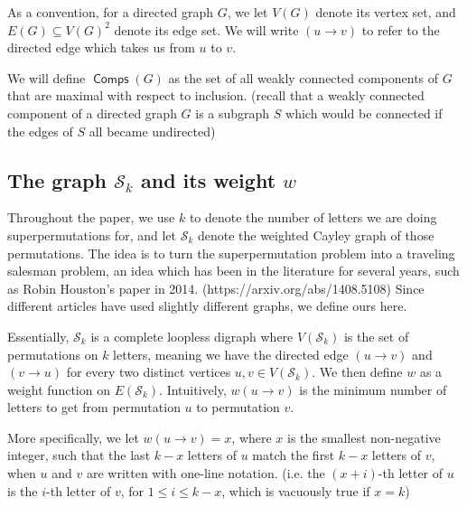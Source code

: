 \documentclass{article}
\theoremstyle{definition}
\DeclareMathOperator{\Comp}{\bm{\mathsf{Comps}}}
\newcommand{\hide}[1]{}
\begin{document}
As a convention, for a directed graph $G$, we let $V(G)$ denote its vertex set, and $E(G) \subseteq V(G)^2$ denote its edge set. We will write $(u\to v)$ to refer to the directed edge which takes us from $u$ to $v$.

We will define $\Comp(G)$ as the set of all weakly connected components of $G$ that are maximal with respect to inclusion. (recall that a weakly connected component of a directed graph $G$ is a subgraph $S$ which would be connected if the edges of $S$ all became undirected)

\subsection{The graph $\mathcal{S}_k$ and its weight $w$} 

Throughout the paper, we use $k$ to denote the number of letters we are doing superpermutations for, and let $\mathcal{S}_k$ denote the weighted Cayley graph of those permutations. The idea is to turn the superpermutation problem into a traveling salesman problem, an idea which has been in the literature for several years, such as Robin Houston's paper in 2014. (https://arxiv.org/abs/1408.5108)\hide{@misc{houston2014tackling,
    title={Tackling the Minimal Superpermutation Problem},
    author={Robin Houston},
    year={2014},
    eprint={1408.5108},
    archivePrefix={arXiv},
    primaryClass={math.CO}
}} Since different articles have used slightly different graphs, we define ours here.

Essentially, $\mathcal{S}_k$ is a complete loopless digraph where $V(\mathcal{S}_k)$ is the set of permutations on $k$ letters, meaning we have the directed edge $(u \to v)$ and $(v \to u)$ for every two distinct vertices $u,v \in V(\mathcal{S}_k)$. We then define $w$ as a weight function on $E(\mathcal{S}_k)$. Intuitively, $w(u\to v)$ is the minimum number of letters to get from permutation $u$ to permutation $v$. 
 
 More specifically, we let $w(u\to v) = x$, where $x$ is the smallest non-negative integer, such that the last $k-x$ letters of $u$ match the first $k-x$ letters of $v$, when $u$ and $v$ are written with one-line notation. (i.e. the $(x+i)$-th letter of $u$ is the $i$-th letter of $v$, for $1\le i \le k-x $, which is vacuously true if $x = k$)
 
 \hide{Specifically, we will define $\mathcal{S}_k$ through the $k$-dimensional De Bruijn graph on $k$ letters, $G_k$. We define $A_k = \{1,2\dots k\}$ which is intuitively our alphabet. We have that $V(G_k) = A_k^k$, and that for each vertex, $v = [a_1, a_2\dots a_k]$, we have the directed edges $(v \to [a_2, a_3 \dots a_k,b])$, for each $b \in A_k$. We then create a weight $w'$, where $w'(u \to v)$ is the length of the shortest directed path from $u$ to $v$ in $G_k$. We then have that $\mathcal{S}_k$ is a directed weighted graph where $V(\mathcal{S}_k)$ is the set of permutations of $A_k$, with $w(u \to v) = w'(u \to v)$ for each $u,v \in V(\mathcal{S}_k)$.}
\end{document}
